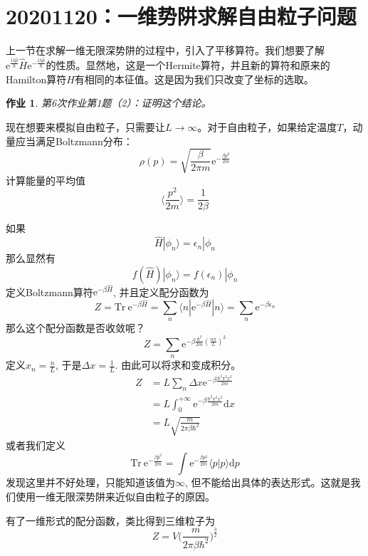 \documentclass[12pt]{article}
\newtheorem{asg}{作业}
\begin{document}
\section{20201120：一维势阱求解自由粒子问题}

    上一节在求解一维无限深势阱的过程中，引入了平移算符。我们想要了解$\mathrm{e}^{\frac {\mathrm{i}\lambda \hat{p}}{\hbar}} \hat{H} \mathrm{e}^{-\frac {\mathrm{i}\lambda \hat{p}}{\hbar}}$的性质。显然地，这是一个Hermite算符，并且新的算符和原来的Hamilton算符$\hat{H}$有相同的本征值。这是因为我们只改变了坐标的选取。
    \begin{asg}
        第6次作业第1题（2）：证明这个结论。
    \end{asg}
    现在想要来模拟自由粒子，只需要让$L \to \infty$。对于自由粒子，如果给定温度$T$，动量应当满足Boltzmann分布：
    \[ \rho(p) = \sqrt{\frac {\beta}{2\pi m}}\mathrm{e}^{-\frac {\beta p^2}{2m}} \]
    计算能量的平均值
    \[ \langle \frac {p^2}{2m} \rangle = \frac 1{2\beta} \]

    如果
    \[ \hat{H} | \phi_n \rangle = \epsilon_n |\phi_n \]
    那么显然有
    \[ f(\hat{H})|\phi_n \rangle = f(\epsilon_n)|\phi_n \]
    定义Boltzmann算符$\mathrm{e}^{-\beta\hat{H}}$, 并且定义配分函数为
    \[ Z = \mathrm{Tr}\  \mathrm{e}^{-\beta \hat{H}} = \sum_n \langle n| \mathrm{e}^{-\beta \hat{H}} | n \rangle = \sum_n \mathrm{e}^{-\beta \epsilon_n }\]
    那么这个配分函数是否收敛呢？
    \[ Z = \sum_n \mathrm{e}^{-\beta \frac {\hbar^2}{2m} (\frac {n\pi}L)^2} \]
    定义$x_n = \frac nL$, 于是$\Delta x = \frac 1L$. 由此可以将求和变成积分。
    \begin{equation}\begin{aligned}
        Z &= L \sum_n \Delta x \mathrm{e}^{-\beta \frac {\hbar^2\pi^2 x^2}{2m} }\\
        &= L \int_0^{+\infty} \mathrm{e}^{-\beta \frac {\hbar^2\pi^2 x^2}{2m}} \mathrm{d}x\\
        &= L\sqrt{\frac m{2\pi \beta \hbar^2}}
    \end{aligned}\end{equation}
    或者我们定义
    \[ \mathrm{Tr} \ \mathrm{e}^{-\frac {\beta \hat{p}^2}{2m}} = \int \mathrm{e}^{-\frac {\beta p^2}{2m}} \langle p|p\rangle \mathrm{d}p \]
    发现这里并不好处理，只能知道该值为$\infty$, 但不能给出具体的表达形式。这就是我们使用一维无限深势阱来近似自由粒子的原因。

    有了一维形式的配分函数，类比得到三维粒子为
    \[ Z = V \bigg(\frac m{2\pi \beta \hbar^2}\bigg)^{\frac 32} \]
\end{document}
